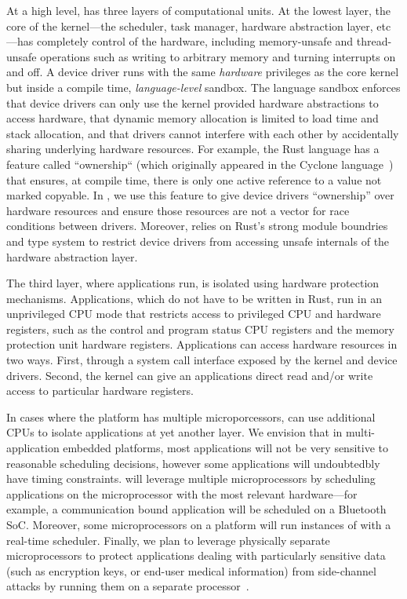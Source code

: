 At a high level, \name has three layers of computational units. At the lowest
layer, the core of the kernel---the scheduler, task manager, hardware
abstraction layer, etc---has completely control of the hardware, including
memory-unsafe and thread-unsafe operations such as writing to arbitrary memory
and turning interrupts on and off. A device driver runs with the same
\emph{hardware} privileges as the core kernel but inside a compile time,
\emph{language-level} sandbox. The language sandbox enforces that device drivers
can only use the kernel provided hardware abstractions to access hardware, that
dynamic memory allocation is limited to load time and stack allocation, and that
drivers cannot interfere with each other by accidentally sharing underlying
hardware resources. For example, the Rust language has a feature called
``ownership`` (which originally appeared in the Cyclone language~\cite{cyclone})
that ensures, at compile time, there is only one active reference to a
value not marked copyable. In \name, we use this feature to give device drivers
``ownership'' over hardware resources and ensure those resources are not a
vector for race conditions between drivers. Moreover, \name relies on Rust's
strong module boundries and type system to restrict device drivers from
accessing unsafe internals of the hardware abstraction layer.

The third layer, where applications run, is isolated using hardware protection
mechanisms. Applications, which do not have to be written in Rust, run in an
unprivileged CPU mode that restricts access to privileged CPU and hardware
registers, such as the control and program status CPU registers and the memory
protection unit hardware registers. Applications can access hardware resources
in two ways. First, through a system call interface exposed by the kernel and
device drivers.  Second, the kernel can give an applications direct read and/or
write access to particular hardware registers.

In cases where the platform has multiple microporcessors, \name can use
additional CPUs to isolate applications at yet another layer. We envision that
in multi-application embedded platforms, most applications will not be very
sensitive to reasonable scheduling decisions, however some applications will
undoubtedbly have timing constraints. \name will leverage multiple
microprocessors by scheduling applications on the microprocessor with the most
relevant hardware---for example, a communication bound application will be
scheduled on a Bluetooth SoC. Moreover, some microprocessors on a platform will
run instances of \name with a real-time scheduler. Finally, we plan to leverage
physically separate microprocessors to protect applications dealing with
particularly sensitive data (such as encryption keys, or end-user medical
information) from side-channel attacks by running them on a separate
processor~\cite{trustzone}.

